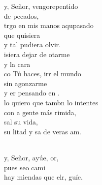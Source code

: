 \documentclass[12pt]{article}
\begin{document}
\begin{multicols*}{2}
\begin{cancion}%
	y, Señor, vengorepentido \\
	de  pecados,\\
	trgo en mis manos aqupasado\\
	que  quisiera \\
	y tal  pudiera olvir.\\
	isiera dejar de otarme \\
	y  la cara\\
	co Tú haces, irr el mundo\\
	sin agonzarme \\
	y er pensando en .\\
	lo quiero que tambn lo intentes\\
	con a gente más rimida, \\
	sal su vida,\\
	su litad y sa de veras am.\\\jump\\
	\begin{chorus}%
	y, Señor, ayúe, or,  \\
	pues seo cami\\
	hay miendas que elr, guíe.\\
	\end{chorus}%
	\jump\\
\end{cancion}%


\end{multicols*}
\end{document}
